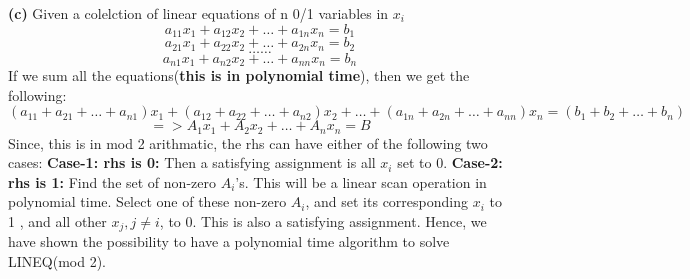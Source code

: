 \documentclass{article}
\renewcommand\part[1]{\vspace{.10in}\textbf{(#1)}}
\begin{document}
\part{c}
Given a colelction of linear equations of n 0/1 variables in $x_{i}$
\[ a_{11}x_{1} + a_{12}x_{2} + \dots + a_{1n}x_{n} = b_{1} \]
\[ a_{21}x_{1} + a_{22}x_{2} + \dots + a_{2n}x_{n} = b_{2} \]
\[ \dots \dots \]
\[ a_{n1}x_{1} + a_{n2}x_{2} + \dots + a_{nn}x_{n} = b_{n} \]
If we sum all the equations(\textbf {this is in polynomial time}), then we get the following: 
\[ (a_{11} + a_{21} + \dots + a_{n1})x_{1} + (a_{12} + a_{22} + \dots + a_{n2})x_{2} + \dots + (a_{1n} + a_{2n} + \dots + a_{nn})x_{n} = (b_{1} + b_{2} + \dots + b_{n})\]
\begin{equation}
 => A_{1}x_{1} + A_{2}x_{2} + \dots + A_{n}x_{n} = B
\end{equation}
Since, this is in mod 2 arithmatic, the rhs can have either of the following two cases: \newline
\hspace*{0.5cm} \textbf {Case-1: rhs is 0: } Then a satisfying assignment is all $x_{i}$ set to 0. \newline
\hspace*{0.5cm} \textbf {Case-2: rhs is 1: } Find the set of non-zero $A_{i}$'s. This will be a linear scan operation in polynomial time. Select one of these non-zero $A_{i}$, and set its corresponding $x_{i}$ to 1 , and all other $x_{j},j \neq i$, to 0. This is also a satisfying assignment. \newline
Hence, we have shown the possibility to have a polynomial time algorithm to solve LINEQ(mod 2). \newline
\end{document}
